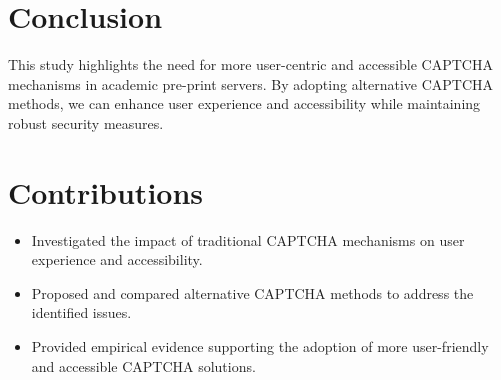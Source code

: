 \documentclass{article}
\begin{document}
\section{Conclusion}
This study highlights the need for more user-centric and accessible CAPTCHA mechanisms in academic pre-print servers. By adopting alternative CAPTCHA methods, we can enhance user experience and accessibility while maintaining robust security measures.

\section{Contributions}
\begin{itemize}
    \item Investigated the impact of traditional CAPTCHA mechanisms on user experience and accessibility.
    \item Proposed and compared alternative CAPTCHA methods to address the identified issues.
    \item Provided empirical evidence supporting the adoption of more user-friendly and accessible CAPTCHA solutions.
\end{itemize}



\end{document}
